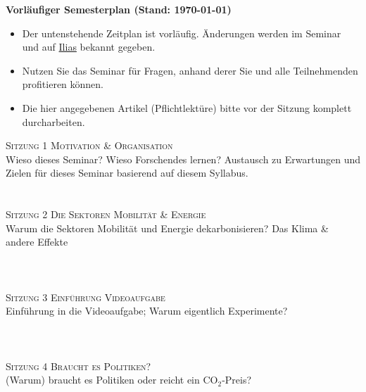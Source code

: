 \documentclass[12pt,a4paper]{article}
\begin{document}
\medskip
\noindent \textbf{Vorläufiger Semesterplan (Stand: \today)}
\begin{itemize}
    \item Der untenstehende Zeitplan ist vorläufig. Änderungen werden im Seminar und auf \href{https://ilias.unibe.ch/goto_ilias3_unibe_crs_3414477.html}{Ilias} bekannt gegeben.
    \item Nutzen Sie das Seminar für Fragen, anhand derer Sie und alle Teilnehmenden profitieren können. 
    \smallskip 
\item Die hier angegebenen Artikel (Pflichtlektüre) bitte vor der Sitzung komplett durcharbeiten. 
\end{itemize}
\newpage
\textsc{Sitzung 1 \dotfill Motivation \& Organisation} \smallskip \\ 
{\color{darkgreen}{\Rectangle}} Wieso dieses Seminar? Wieso Forschendes lernen? Austausch zu Erwartungen und Zielen für dieses Seminar basierend auf diesem Syllabus. \\
{\color{darkgreen}{\Rectangle}} 
\\ 
\medskip  \\	


\textsc{Sitzung 2 \dotfill Die Sektoren Mobilität \& Energie}  \smallskip \\ 
{\color{darkgreen}{\Rectangle}} Warum die Sektoren Mobilität und Energie dekarbonisieren? Das Klima \&  andere Effekte\\
{\color{darkgreen}{\Rectangle}}   \\ 
{\color{darkgreen}{\Rectangle}}  \\
\medskip  \\	


\textsc{Sitzung 3 \dotfill Einführung Videoaufgabe} \smallskip \\ 
{\color{darkgreen}{\Rectangle}} Einführung in die Videoaufgabe; Warum eigentlich Experimente?\\ 
{\color{darkgreen}{\Rectangle}}  \\ 
 {\color{darkgreen}{\Rectangle}}  \\ 
\medskip  \\	


\textsc{Sitzung 4 \dotfill Braucht es Politiken?} \smallskip \\ 
{\color{darkgreen}{\Rectangle}} (Warum) braucht es Politiken oder reicht ein CO$_2$-Preis?\\ 
{\color{darkgreen}{\Rectangle}}  \\ 
{\color{darkgreen}{\Rectangle}}    \\ 
\medskip  \\	
\end{document}
